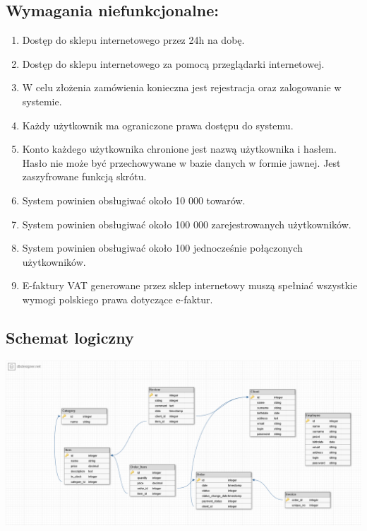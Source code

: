 \documentclass[10pt,a4paper]{article}
\begin{document}
     \subsection{Wymagania niefunkcjonalne:}
     \begin{enumerate}
	   \item Dostęp do sklepu internetowego przez 24h na dobę.
	   \item Dostęp do sklepu internetowego za pomocą przeglądarki internetowej.
	   \item W celu złożenia zamówienia konieczna jest rejestracja oraz zalogowanie w systemie.
	   \item Każdy użytkownik ma ograniczone prawa dostępu do systemu.
	   \item Konto każdego użytkownika chronione jest nazwą użytkownika i hasłem. Hasło nie może być przechowywane w bazie 				     danych w formie jawnej. Jest zaszyfrowane funkcją skrótu.
	   \item System powinien obsługiwać około 10 000 towarów.
	   \item System powinien obsługiwać około 100 000 zarejestrowanych użytkowników.
	   \item System powinien obsługiwać około 100 jednocześnie połączonych użytkowników.
	   \item E-faktury VAT generowane przez sklep internetowy muszą spełniać wszystkie wymogi 
		     polskiego prawa dotyczące e-faktur. 
	  \end{enumerate}
	  
	  \begin{landscape}
	  \pagestyle{empty}
      \subsection{Schemat logiczny}
        \includegraphics[scale=0.4]{schematlogiczny}
      \end{landscape}
      
\end{document}
